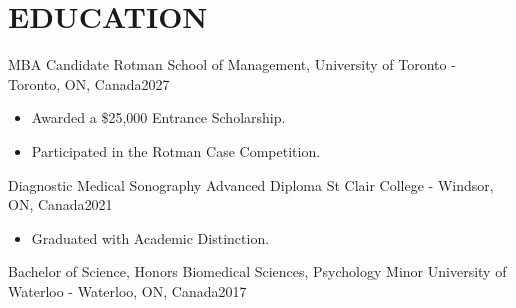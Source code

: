 
\section{\textcolor{airforceblue}{EDUCATION}}
  \employmentSubheadingListStart
    \employmentSubheading
      {MBA Candidate}{}
      {Rotman School of Management, University of Toronto - Toronto, ON, Canada}{2027}
      \begin{itemize}[leftmargin=1.5em]
        \item Awarded a \$25,000 Entrance Scholarship.
        \item Participated in the Rotman Case Competition.
      \end{itemize}
    \employmentSubheading
      {Diagnostic Medical Sonography Advanced Diploma}{}
      {St Clair College - Windsor, ON, Canada}{2021}
      \begin{itemize}[leftmargin=1.5em]
        \item Graduated with Academic Distinction.
      \end{itemize}
    \employmentSubheading
      {Bachelor of Science, Honors Biomedical Sciences, Psychology Minor}{}
      {University of Waterloo - Waterloo, ON, Canada}{2017}
  \employmentSubheadingListEnd
  \vspace{-10pt}
